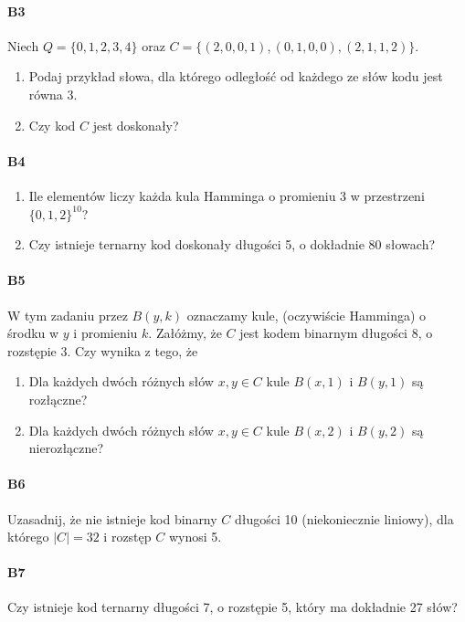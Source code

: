 \paragraph{B3} Niech $Q = \{0, 1, 2, 3, 4\}$ oraz $C = \{(2, 0, 0, 1),(0, 1, 0, 0),(2, 1, 1, 2)\}$.
\begin{enumerate}[label=\alph*)]
\item Podaj przykład słowa, dla którego odległość od każdego ze słów kodu jest równa 3.
\item Czy kod $C$ jest doskonały?
\end{enumerate}


\paragraph{B4}
\begin{enumerate}[label=\alph*)]
\item Ile elementów liczy każda kula Hamminga o promieniu 3 w przestrzeni $\{0, 1, 2\}^{10}$?
\item Czy istnieje ternarny kod doskonały długości 5, o dokładnie 80 słowach?
\end{enumerate}

\paragraph{B5} W tym zadaniu przez $B(y, k)$ oznaczamy kule, (oczywiście Hamminga) o środku w $y$ i promieniu $k$. Załóżmy, że $C$ jest kodem binarnym długości 8, o rozstępie 3. Czy wynika z tego, że
\begin{enumerate}[label=\alph*)]
\item Dla każdych dwóch różnych słów $x, y \in C$ kule $B(x, 1)$ i $B(y, 1)$ są rozłączne?
\item Dla każdych dwóch różnych słów $x, y \in C$ kule $B(x, 2)$ i $B(y, 2)$ są nierozłączne?
\end{enumerate}

\paragraph{B6} Uzasadnij, że nie istnieje kod binarny $C$ długości 10 (niekoniecznie liniowy), dla którego $|C| = 32$ i rozstęp $C$ wynosi 5.

\paragraph{B7} Czy istnieje kod ternarny długości 7, o rozstępie 5, który ma dokładnie 27 słów?

